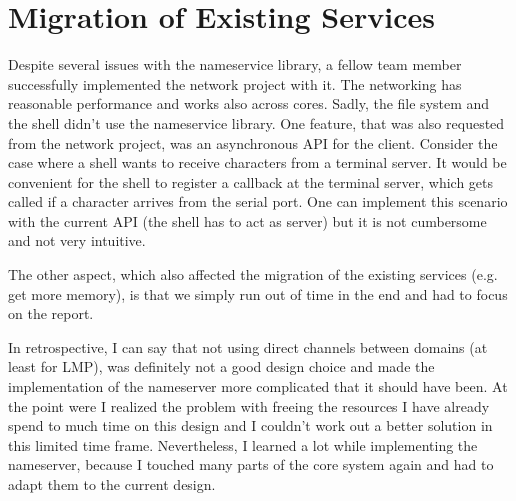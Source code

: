 \section{Migration of Existing Services}

Despite several issues with the nameservice library, a fellow team member successfully implemented the network project with it. The
networking has reasonable performance and works also across cores. Sadly, the file system and the shell didn't use the nameservice
library. One feature, that was also requested from the network project, was an asynchronous API for the client. Consider the case
where a shell wants to receive characters from a terminal server. It would be convenient for the shell to register a callback at
the terminal server, which gets called if a character arrives from the serial port. One can implement this scenario with the current
API (the shell has to act as server) but it is not cumbersome and not very intuitive.

The other aspect, which also affected the migration of the existing services (e.g. get more memory), is that we simply run out of
time in the end and had to focus on the report.

In retrospective, I can say that not using direct channels between domains (at least for LMP), was definitely not a good design choice and
made the implementation of the nameserver more complicated that it should have been. At the point were I realized the problem with freeing
the resources I have already spend to much time on this design and I couldn't work out a better solution in this limited time frame. 
Nevertheless, I learned a lot while implementing the nameserver, because I touched many parts of the core system again and had to adapt them
to the current design.
